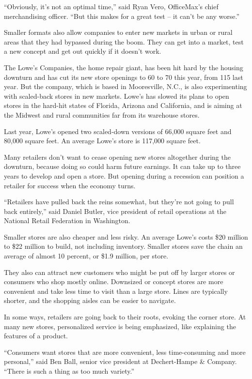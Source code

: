 \documentclass[12pt,a4paper,onecolumn]{article}
\begin{document}
``Obviously, it's not an optimal time,'' said Ryan Vero, OfficeMax's chief merchandising officer.
``But this makes for a great test -- it can't be any worse.''

Smaller formats also allow companies to enter new markets in urban or rural areas that they had
bypassed during the boom. They can get into a market, test a new concept and get out quickly if it
doesn't work.

The Lowe's Companies, the home repair giant, has been hit hard by the housing downturn and has cut
its new store openings to 60 to 70 this year, from 115 last year. But the company, which is based in
Mooresville, N.C., is also experimenting with scaled-back stores in new markets. Lowe's has slowed
its plans to open stores in the hard-hit states of Florida, Arizona and California, and is aiming at
the Midwest and rural communities far from its warehouse stores.

Last year, Lowe's opened two scaled-down versions of 66,000 square feet and 80,000 square feet. An
average Lowe's store is 117,000 square feet.

Many retailers don't want to cease opening new stores altogether during the downturn, because doing
so could harm future earnings. It can take up to three years to develop and open a store. But
opening during a recession can position a retailer for success when the economy turns.

``Retailers have pulled back the reins somewhat, but they're not going to pull back entirely,'' said
Daniel Butler, vice president of retail operations at the National Retail Federation in Washington.

Smaller stores are also cheaper and less risky. An average Lowe's costs \$20 million to \$22 million
to build, not including inventory. Smaller stores save the chain an average of almost 10 percent, or
\$1.9 million, per store.

They also can attract new customers who might be put off by larger stores or consumers who shop
mostly online. Downsized or concept stores are more convenient and take less time to visit than a
large store. Lines are typically shorter, and the shopping aisles can be easier to navigate.

In some ways, retailers are going back to their roots, evoking the corner store. At many new stores,
personalized service is being emphasized, like explaining the features of a product.

``Consumers want stores that are more convenient, less time-consuming and more personal,'' said Ben
Ball, senior vice president at Dechert-Hampe \& Company. ``There is such a thing as too much
variety.''
\end{document}

